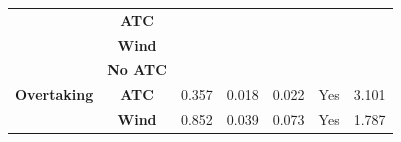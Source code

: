 \begin{table}
\begin{tabular}{|c|c|c|c|c|c|c|}
\cline{2-7}
                                                                                                   & \textbf{ATC}                                                                                      &                &                   &                                                                      &                                                                                                     &                                                                                                      \\ 
\cline{2-7}
                                                                                                   & \textbf{Wind}                                                                                     &                &                   &                                                                      &                                                                                                     &                                                                                                      \\ 
\hline
\multirow{3}{*}{\textbf{Overtaking} }                                                              & \textbf{No ATC}                                                                                   &                &                   &                                                                      &                                                                                                     &                                                                                                      \\ 
\cline{2-7}
                                                                                                   & \textbf{ATC}                                                                                      & 0.357          & 0.018             & 0.022                                                                & Yes                                                                                                 & 3.101                                                                                                \\ 
\cline{2-7}
                                                                                                   & \textbf{Wind}                                                                                     & 0.852          & 0.039             & 0.073                                                                & Yes                                                                                                 & 1.787                                                                                                \\
\hline
\end{tabular}
\label{tab:results}
\end{table}